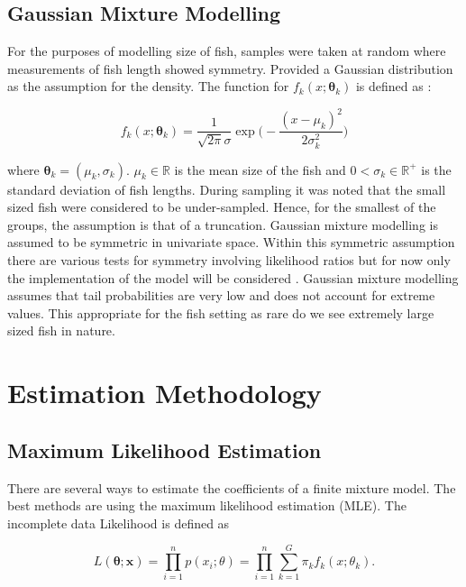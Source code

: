 \documentclass[12pt,letterpaper]{report}
\theoremstyle{definition}
\begin{document}
\section{Gaussian Mixture Modelling}

For the purposes of modelling size of fish, samples were taken at random where measurements of fish length showed symmetry. Provided a Gaussian distribution as the assumption for the density.  The function for $f_k( x ; \bm{ \theta }_k) $ is defined as : 

$$f_k(x;\bm{\theta}_k) = \frac{1}{\sqrt{2\pi}\sigma}\exp\bigg(-\frac{(x - \mu_k)^2}{2\sigma_k^2} \bigg)$$

where $\bm{\theta}_k = (\mu_k, \sigma_k)$.  $\mu_k \in \mathbb{R} $ is the mean size of the fish and $0 < \sigma_k \in \mathbb{R^+} $ is the standard deviation of fish lengths. During sampling it was noted that the small sized fish were considered to be under-sampled. Hence, for the smallest of the groups, the assumption is that of a truncation. Gaussian mixture modelling is assumed to be symmetric in univariate space. Within this symmetric assumption there are various tests for symmetry involving likelihood ratios but for now only the implementation of the model will be considered \citep{symGar}. Gaussian mixture modelling assumes that tail probabilities are very low and does not account for extreme values. This appropriate for the fish setting as rare do we see extremely large sized fish in nature. 



\chapter{Estimation Methodology}
\section{Maximum Likelihood Estimation} There are several ways to estimate the coefficients of a finite mixture model. The best methods are using the maximum likelihood estimation (MLE). The incomplete data Likelihood is defined as 

$$L(\bm{\theta}; \bm{x}) = \prod_{i=1}^np(x_i ; \theta) = \prod_{i=1}^n\sum_{k=1}^G \pi_k f_k(x;\theta_k). $$
\end{document}
